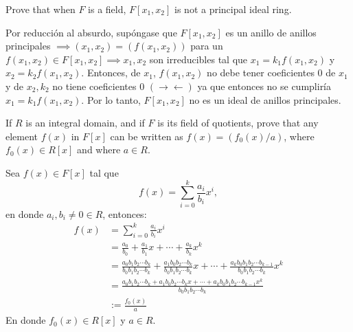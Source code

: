 \begin{problema}[Problema 8]
   Prove that when $F$ is a field, $F\left[x_1, x_2\right]$ is not a principal ideal ring.
\begin{dem}
    Por reducción al absurdo, supóngase que $F[x_1,x_2]$ es un anillo de anillos principales $\implies (x_1,x_2)=(f(x_1,x_2))$ para un $f(x_1,x_2)\in F[x_1,x_2]\implies x_1,x_2$ son irreducibles tal que $x_1=k_1f(x_1,x_2)$ y $x_2=k_2f(x_1,x_2)$. Entonces, de $x_1$, $f(x_1,x_2)$ no debe tener coeficientes 0 de $x_1$ y de $x_2,k_2$ no tiene coeficientes 0 $(\to\gets)$ ya que entonces no se cumpliría $x_1=k_1f(x_1,x_2)$. Por lo tanto, $F\left[x_1, x_2\right]$ no es un ideal de anillos principales.
\end{dem}
\end{problema}

\begin{problema}[Problema 11]
    If $R$ is an integral domain, and if $F$ is its field of quotients, prove that any element $f(x)$ in $F[x]$ can be written as $f(x)=\left(f_0(x) / a\right)$, where $f_0(x) \in R[x]$ and where $a \in R$.
    \begin{dem}
        Sea $f(x)\in F[x]$ tal que 
        $$f(x)=\sum_{i=0}^k\frac{a_i}{b_i}x^i,$$
        en donde $a_i,b_i\neq 0 \in R$, entonces:
        \begin{align*}
            f(x) &=\sum_{i=0}^k\frac{a_i}{b_i}x^i\\
                &= \frac{a_0}{b_0}+ \frac{a_1}{b_1}x+\cdots + \frac{a_k}{b_k}x^k\\
                &= \frac{a_0b_1b_2\cdots b_k}{b_0b_1b_2\cdots b_k}+\frac{a_1b_0b_2\cdots b_k}{b_0b_1b_2\cdots b_k}x+\cdots+\frac{a_kb_0b_1b_2\cdots b_{k-1}}{b_0b_1b_2\cdots b_k}x^k\\
                &= \frac{a_0b_1b_2\cdots b_k+a_1b_0b_2\cdots b_kx+\cdots+a_kb_0b_1b_2\cdots b_{k-1}x^k}{b_0b_1b_2\cdots b_k}\\
                &:= \frac{f_0(x)}{a}
        \end{align*}
        En donde $f_0(x)\in R[x]$ y $a\in R$.
    \end{dem}
\end{problema}

%
%

